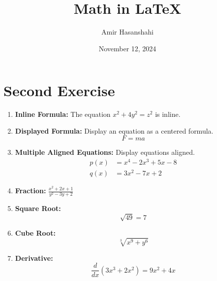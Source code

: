 \documentclass{article}
\title{Math in LaTeX}
\author{Amir Hasanshahi}
\date{November 12, 2024}
\begin{document}
	\maketitle

	\section*{Second Exercise}
	\begin{enumerate}
		\item \textbf{Inline Formula:} The equation $x^{2}+ 4y^{2}= z^{2}$ is inline.

		\item \textbf{Displayed Formula:} Display an equation as a centered formula.
			\begin{equation}
				F = ma
			\end{equation}

		\item \textbf{Multiple Aligned Equations:} Display equations aligned.
			\begin{align}
				p(x) & = x^{4}- 2x^{3}+ 5x - 8 \\
				q(x) & = 3x^{2}- 7x + 2
			\end{align}

		\item \textbf{Fraction:} $\frac{x^{2}+ 2x + 1}{y^{2}- 3y + 2}$

		\item \textbf{Square Root:}
			\begin{equation}
				\sqrt{49}= 7
			\end{equation}

		\item \textbf{Cube Root:}
			\begin{equation}
				\sqrt[3]{x^{9}+ y^{6}}
			\end{equation}

		\item \textbf{Derivative:}
			\begin{equation}
				\frac{d}{dx}(3x^{3}+ 2x^{2}) = 9x^{2}+ 4x
			\end{equation}
	\end{enumerate}
\end{document}
